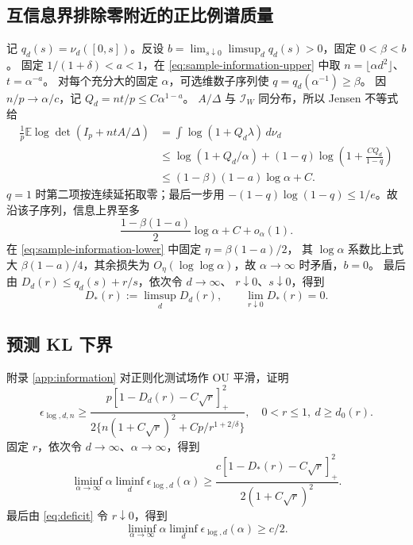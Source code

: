 \documentclass[a4paper]{tufte-handout}
\newcommand{\E}{\mathbb E}
\begin{document}
\begin{fullwidth}
\subsection{互信息界排除零附近的正比例谱质量}
记 $q_d(s)=\nu_d([0,s])$。反设
$b=\lim_{s\downarrow0}\limsup_dq_d(s)>0$，固定 $0<\beta<b$。
固定 $1/(1+\delta)<a<1$，在 \eqref{eq:sample-information-upper} 中取
$n=\lfloor\alpha d^2\rfloor$、$t=\alpha^{-a}$。
对每个充分大的固定 $\alpha$，可选维数子序列使
$q=q_d(\alpha^{-1})\ge\beta$。
因 $n/p\to\alpha/c$，记 $Q_d=nt/p\le C\alpha^{1-a}$。
$A/\Delta$ 与 $\mathcal I_W$ 同分布，所以 Jensen 不等式给
\[
 \begin{aligned}
 \frac1p\E\log\det(I_p+ntA/\Delta)
 &=\int\log(1+Q_d\lambda)\,d\nu_d\\
 &\le\log(1+Q_d/\alpha)
 +(1-q)\log\left(1+\frac{CQ_d}{1-q}\right)\\
 &\le(1-\beta)(1-a)\log\alpha+C.
 \end{aligned}
\]
$q=1$ 时第二项按连续延拓取零；最后一步用
$-(1-q)\log(1-q)\le1/e$。故沿该子序列，信息上界至多
\[
 \frac{1-\beta(1-a)}2\log\alpha+C+o_\alpha(1).
\]
在 \eqref{eq:sample-information-lower} 中固定 $\eta=\beta(1-a)/2$，
其 $\log\alpha$ 系数比上式大 $\beta(1-a)/4$，其余损失为
$O_\eta(\log\log\alpha)$，故 $\alpha\to\infty$ 时矛盾，$b=0$。
最后由 $D_d(r)\le q_d(s)+r/s$，依次令 $d\to\infty$、
$r\downarrow0$、$s\downarrow0$，得到
\begin{equation}\label{eq:deficit}
 D_*(r):=\limsup_dD_d(r),\qquad \lim_{r\downarrow0}D_*(r)=0.
\end{equation}

\subsection{预测 KL 下界}
附录 \ref{app:information} 对正则化测试场作 OU 平滑，证明
\begin{equation}\label{eq:lower-unified}
\epsilon_{\log,d,n}\ge
\frac{p[1-D_d(r)-C\sqrt r]_+^2}
{2\{n(1+C\sqrt r)^2+Cp/r^{1+2/\delta}\}},\quad 0<r\le1,\ d\ge d_0(r).
\end{equation}
固定 $r$，依次令 $d\to\infty$、$\alpha\to\infty$，得到
\[
 \liminf_{\alpha\to\infty}\alpha\liminf_d\epsilon_{\log,d}(\alpha)
 \ge \frac{c[1-D_*(r)-C\sqrt r]_+^2}{2(1+C\sqrt r)^2}.
\]
最后由 \eqref{eq:deficit} 令 $r\downarrow0$，得到
\begin{equation}\label{eq:lower-final}
\liminf_{\alpha\to\infty}\alpha\liminf_d\epsilon_{\log,d}(\alpha)\ge c/2.
\end{equation}


\end{fullwidth}
\end{document}
